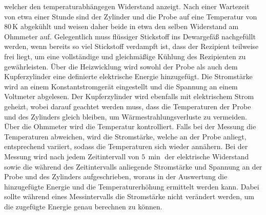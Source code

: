 welcher den temperaturabhängegen Widerstand anzeigt.
Nach einer Wartezeit von etwa einer Stunde sind der Zylinder und die Probe auf eine Temperatur von
$80 \, \si{\kelvin}$ abgekühlt und weisen daher beide in etwa den selben Widerstand am Ohmmeter auf.
Gelegentlich muss flüssiger Stickstoff ins Dewargefäß nachgefüllt werden, wenn bereits
so viel Stickstoff verdampft ist, dass der Rezipient teilweise frei liegt,
um eine vollständige und gleichmäßige Kühlung des Rezipienten zu gewährleisten.
Über die Heizwicklung wird sowohl der Probe als auch dem Kupferzylinder eine definierte elektrische Energie hinzugefügt.
Die Stromstärke wird an einem Konstantstromgerät eingestellt und die Spannung an einem Voltmeter abgelesen.
Der Kupferzylinder wird ebenfalls mit elektrischem Strom geheizt, wobei darauf geachtet werden  muss,
dass die Temperaturen der Probe und des Zylinders gleich bleiben, um Wärmestrahlungsverluste zu vermeiden.
Über die Ohmmeter wird die Temperatur kontrolliert.
Falls bei der Messung die Temperaturen abweichen, wird die Stromstärke, welche an der Probe anliegt,
entsprechend variiert, sodass die Temperaturen sich wieder annähern.
Bei der Messung wird nach jedem Zeitintervall von $5 \, \si{\min}$ der elektrische Widerstand
sowie die während des Zeitintervalls anliegende Stromstärke und Spannung an der Probe und des Zylinders aufgeschrieben,
woraus in der Auswertung die hinzugefügte Energie und die Temperaturerhöhung ermittelt werden kann.
Dabei sollte während eines Messintervalls die Stromstärke nicht verändert werden,
um die zugefügte Energie genau berechnen zu können.
